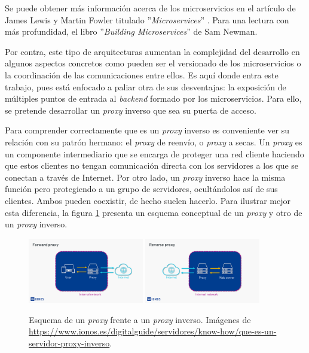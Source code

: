\documentclass[11pt,spanish,listoffigures]{tfgetsinf}
\begin{document}
Se puede obtener más información acerca de los microservicios en el artículo de James Lewis y Martin Fowler titulado ''\emph{Microservices}'' \cite{LewisAndFowler}. Para una lectura con más profundidad, el libro ''\emph{Building Microservices}'' \cite{Newman} de Sam Newman.

Por contra, este tipo de arquitecturas aumentan la complejidad del desarrollo en algunos aspectos concretos como pueden ser el versionado de los microservicios o la coordinación de las comunicaciones entre ellos. Es aquí donde entra este trabajo, pues está enfocado a paliar otra de sus desventajas: la exposición de múltiples puntos de entrada al \emph{backend} formado por los microservicios. Para ello, se pretende desarrollar un \emph{proxy} inverso que sea su puerta de acceso.

Para comprender correctamente que es un \emph{proxy} inverso es conveniente ver su relación con su patrón hermano: el \emph{proxy} de reenvío, o \emph{proxy} a secas. Un \emph{proxy} es un componente intermediario que se encarga de proteger una red cliente haciendo que estos clientes no tengan comunicación directa con los servidores a los que se conectan a través de Internet. Por otro lado, un \emph{proxy} inverso hace la misma función pero protegiendo a un grupo de servidores, ocultándolos así de sus clientes. Ambos pueden coexistir, de hecho suelen hacerlo. Para ilustrar mejor esta diferencia, la figura \ref{proxyContraProxyInverso} presenta un esquema conceptual de un \emph{proxy} y otro de un \emph{proxy} inverso.

\begin{figure}[ht]
\centering
\includegraphics[width=0.45\textwidth]{imagenes/proxy}
\includegraphics[width=0.45\textwidth]{imagenes/proxyInverso}
\caption{Esquema de un \emph{proxy} frente a un \emph{proxy} inverso. Imágenes de \url{https://www.ionos.es/digitalguide/servidores/know-how/que-es-un-servidor-proxy-inverso}.}
	\label{proxyContraProxyInverso}
\end{figure}
\end{document}
